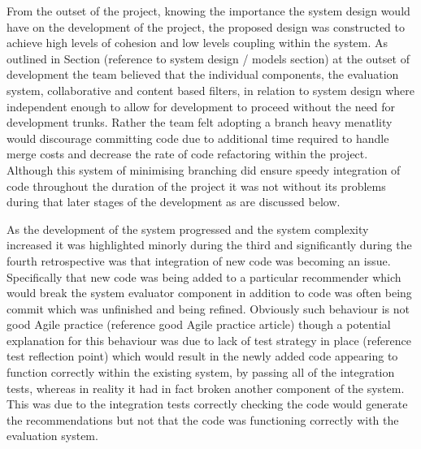 \documentclass{l3proj}
\begin{document}


From the outset of the project, knowing the importance the system design would have on the development of the project, the proposed design was constructed to achieve high levels of cohesion and low levels coupling within the system. As outlined in Section (reference to system design / models section) at the outset of development the team believed that the individual components, the evaluation system, collaborative and content based filters, in relation to system design where independent enough to allow for development to proceed without the need for development trunks. Rather the team felt adopting a branch heavy menatlity would discourage committing code due to additional time required to handle merge costs and decrease the rate of code refactoring within the project. Although this system of minimising branching did ensure speedy integration of code throughout the duration of the project it was not without its problems during that later stages of the development as are discussed below.

As the development of the system progressed and the system complexity increased it was highlighted minorly during the third and significantly during the fourth retrospective was that integration of new code was becoming an issue. Specifically that new code was being added to a particular recommender which would break the system evaluator component in addition to code was often being commit which was unfinished and being refined. Obviously such behaviour is not good Agile practice (reference good Agile practice article) though a potential explanation for this behaviour was due to lack of test strategy in place (reference test reflection point) which would result in the newly added code appearing to function correctly within the existing system, by passing all of the integration tests, whereas in reality it had in fact broken another component of the system. This was due to the integration tests correctly checking the code would generate the recommendations but not that the code was functioning correctly with the evaluation system.
\end{document}
